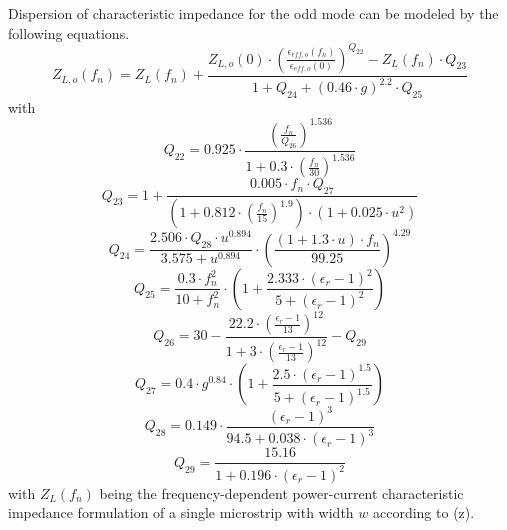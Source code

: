 \documentclass[10pt]{report}
\begin{document}
Dispersion of characteristic impedance for the odd mode can be
modeled by the following equations.
\begin{equation}
Z_{L,o}(f_n) = Z_L(f_n) + \frac{ Z_{L,o}(0)\cdot
               \left( \frac{\epsilon_{eff,o}(f_n)}{\epsilon_{eff,o}(0)} \right) ^{Q_{22}}
	     - Z_L(f_n)\cdot Q_{23} }{ 1+Q_{24}+(0.46\cdot g)^{2.2} \cdot Q_{25} }
\end{equation}
with
\begin{equation}
Q_{22} = 0.925\cdot \frac{ \left( \frac{f_n}{Q_{26}} \right) ^{1.536} }
                         { 1+0.3\cdot \left( \frac{f_n}{30} \right)^{1.536} }
\end{equation}
\begin{equation}
Q_{23} = 1+ \frac{ 0.005\cdot f_n\cdot Q_{27} }
                 { \left( 1+0.812\cdot\left( \frac{f_n}{15} \right) ^{1.9} \right) \cdot
		   (1 + 0.025\cdot u^2) }
\end{equation}
\begin{equation}
Q_{24} = \frac{2.506\cdot Q_{28}\cdot u^{0.894}}{3.575+u^{0.894}} \cdot
         \left( \frac{ (1+1.3\cdot u)\cdot f_n}{99.25} \right)^{4.29}
\end{equation}
\begin{equation}
Q_{25} = \frac{0.3\cdot f_n^2}{10+f_n^2}\cdot
         \left( 1+ \frac{2.333\cdot (\epsilon_r-1)^2}{5+(\epsilon_r-1)^2} \right)
\end{equation}
\begin{equation}
Q_{26} = 30 - \frac{ 22.2\cdot \left( \frac{\epsilon_r-1}{13} \right)^{12} }
                   { 1+ 3\cdot \left( \frac{\epsilon_r-1}{13} \right)^{12} } - Q_{29}
\end{equation}
\begin{equation}
Q_{27} = 0.4\cdot g^{0.84}\cdot \left( 1+
         \frac{2.5\cdot (\epsilon_r-1)^{1.5}}{5+(\epsilon_r-1)^{1.5}} \right)
\end{equation}
\begin{equation}
Q_{28} = 0.149\cdot \frac{(\epsilon_r-1)^3}{94.5+0.038\cdot (\epsilon_r-1)^3}
\end{equation}
\begin{equation}
Q_{29} = \frac{15.16}{1+0.196\cdot (\epsilon_r-1)^2}
\end{equation}
with $Z_L(f_n)$ being the frequency-dependent power-current characteristic
impedance formulation of a single microstrip with width $w$ according to (z).
\end{document}

